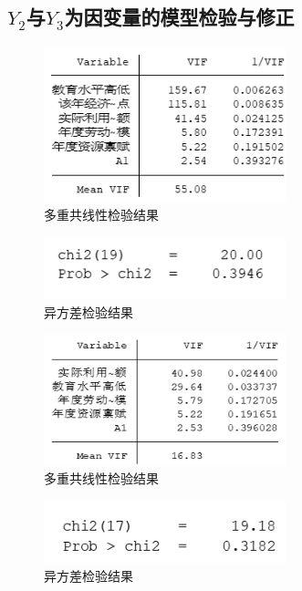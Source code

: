 \documentclass[UTF8]{article}
\begin{document}
	\subsection{$Y_2$与$Y_3$为因变量的模型检验与修正}
	\begin{figure}[htb]
	\centering
	\includegraphics[width=7cm]{pictures/VIF3.png}
	\caption{多重共线性检验结果}
	\label{vif3}
	\end{figure}
	\begin{figure}[htb]
		\centering
		\includegraphics[width=7cm]{pictures/yfcjy3.png}
		\caption{异方差检验结果}
		\label{yfcjy3}
	\end{figure}
	\newpage
	\begin{figure}[htb]
		\centering
		\includegraphics[width=7cm]{pictures/VIF4.png}
		\caption{多重共线性检验结果}
		\label{vif4}
	\end{figure}
	\begin{figure}[htb]
		\centering
		\includegraphics[width=7cm]{pictures/yfcjy4.png}
		\caption{异方差检验结果}
		\label{yfcjy4}
	\end{figure}
\end{document}
